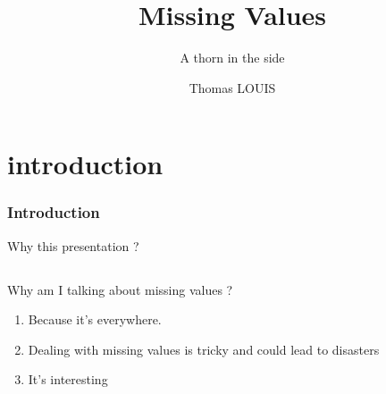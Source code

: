 \documentclass{beamer}
\title{Missing Values}
\subtitle{A thorn in the side}
\author{Thomas LOUIS}\institute{Data scientist}
\begin{document}
\begin{frame}
\titlepage
\end{frame}


\section[introduction]{introduction}
\begin{frame}
\frametitle{Introduction}
	\begin{center}
	\Huge Why this presentation ?
	\end{center}
\end{frame}

\begin{frame}
\end{frame}

%
%
\subsection[Missing values in Data Driven Business]{}
\begin{frame}
	Why am I talking about missing values ?
        \begin{enumerate}
		\item<1- | alert@1> Because it's everywhere.
		\item<2- | alert@2> Dealing with missing values is tricky and could lead to disasters  
		\item<3- | alert@3> It's interesting
	\end{enumerate}
\end{frame}
\end{document}
